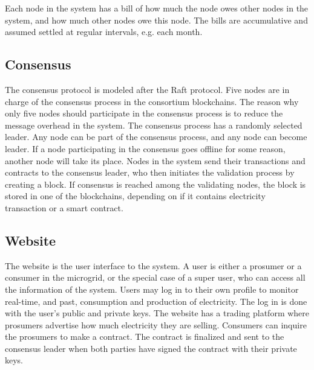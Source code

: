 Each node in the system has a bill of how much the node owes other nodes in the system, and how much other nodes owe this node. The bills are accumulative and assumed settled at regular intervals, e.g. each month.


\subsection{Consensus}
The consensus protocol is modeled after the Raft protocol. Five nodes are in charge of the consensus process in the consortium blockchains. The reason why only five nodes should participate in the consensus process is to reduce the message overhead in the system. The consensus process has a randomly selected leader. Any node can be part of the consensus process, and any node can become leader. If a node participating in the consensus goes offline for some reason, another node will take its place. Nodes in the system send their transactions and contracts to the consensus leader, who then initiates the validation process by creating a block. If consensus is reached among the validating nodes, the block is stored in one of the blockchains, depending on if it contains electricity transaction or a smart contract.

\subsection{Website}
The website is the user interface to the system. A user is either a prosumer or a consumer in the microgrid, or the special case of a super user, who can access all the information of the system. Users may log in to their own profile to monitor real-time, and past, consumption and production of electricity. The log in is done with the user's public and private keys. The website has a trading platform where prosumers advertise how much electricity they are selling. Consumers can inquire the prosumers to make a contract. The contract is finalized and sent to the consensus leader when both parties have signed the contract with their private keys.
